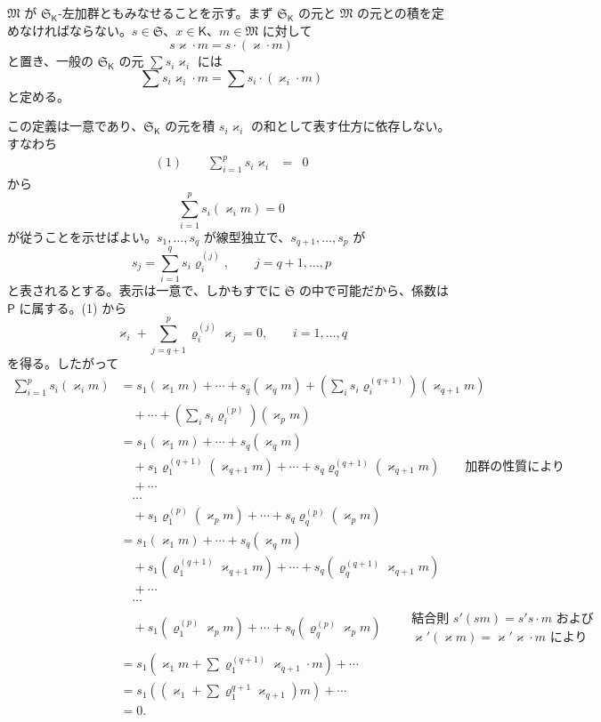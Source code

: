 $\mathfrak M$ が $\mathfrak S_{\mathsf K}$-左加群ともみなせることを示す。まず $\mathfrak S_{\mathsf K}$ の元と $\mathfrak M$ の元との積を定めなければならない。$s\in\mathfrak S$、$x\in\mathsf K$、$m\in\mathfrak M$ に対して
\[
s\varkappa \cdot m=s\cdot(\varkappa \cdot m)
\]
と置き、一般の $\mathfrak S_{\mathsf K}$ の元 $\sum s_i\varkappa _i$ には
\[
\sum s_i\varkappa _i\cdot m=\sum s_i\cdot(\varkappa _i\cdot m)
\]
と定める。

この定義は一意であり、$\mathfrak S_{\mathsf K}$ の元を積 $s_i\varkappa _i$ の和として表す仕方に依存しない。すなわち
\[
\begin{array}{rcl}
(1)\qquad \displaystyle\sum_{i=1}^{p}s_i\varkappa _i&=&0
\end{array}
\]
から
\[
\sum_{i=1}^{p}s_i(\varkappa _i m)=0
\]
が従うことを示せばよい。$s_1,\ldots,s_q$ が線型独立で、$s_{q+1},\ldots,s_p$ が
\[
s_j=\sum_{i=1}^{q}s_i\varrho_i^{(j)},\qquad j=q+1,\ldots,p
\]
と表されるとする。表示は一意で、しかもすでに $\mathfrak S$ の中で可能だから、係数は $\mathsf P$ に属する。(1) から
\[
\varkappa _i+\sum_{j=q+1}^{p}\varrho_i^{(j)}\varkappa _j=0,\qquad i=1,\ldots,q
\]
を得る。したがって
\[
\begin{aligned}
\sum_{i=1}^{p}s_i(\varkappa _i m)
&=s_1(\varkappa _1m)+\cdots+s_q(\varkappa _qm)
  +\left(\sum_i s_i\varrho_i^{(q+1)}\right)(\varkappa _{q+1}m)\\
&\quad+\cdots+\left(\sum_i s_i\varrho_i^{(p)}\right)(\varkappa _pm)\\
&=s_1(\varkappa _1m)+\cdots+s_q(\varkappa _qm)\\
&\quad+s_1\varrho_1^{(q+1)}(\varkappa _{q+1}m)+\cdots+s_q\varrho_q^{(q+1)}(\varkappa _{q+1}m)
  \qquad\text{加群の性質により}\\
&\quad+\cdots\\
&\quad\cdots\\
&\quad+s_1\varrho_1^{(p)}(\varkappa _pm)+\cdots+s_q\varrho_q^{(p)}(\varkappa _pm)\\
&=s_1(\varkappa _1m)+\cdots+s_q(\varkappa _qm)\\
&\quad+s_1(\varrho_1^{(q+1)}\varkappa _{q+1}m)+\cdots+s_q(\varrho_q^{(q+1)}\varkappa _{q+1}m)\\
&\quad+\cdots\\
&\quad\cdots\\
&\quad+s_1(\varrho_1^{(p)}\varkappa _pm)+\cdots+s_q(\varrho_q^{(p)}\varkappa _pm)
  \qquad\begin{gathered}\text{結合則 }s'(sm)=s's\cdot m\text{ および}\\ \varkappa'(\varkappa m)=\varkappa'\varkappa\cdot m\text{ により}\end{gathered}\\
&=s_1\left(\varkappa _1m+\sum\varrho_1^{(q+1)}\varkappa _{q+1}\cdot m\right)+\cdots\\
&=s_1\left(\left(\varkappa _1+\sum\varrho_1^{q+1}\varkappa _{q+1}\right)m\right)+\cdots\\
&=0.
\end{aligned}
\]

